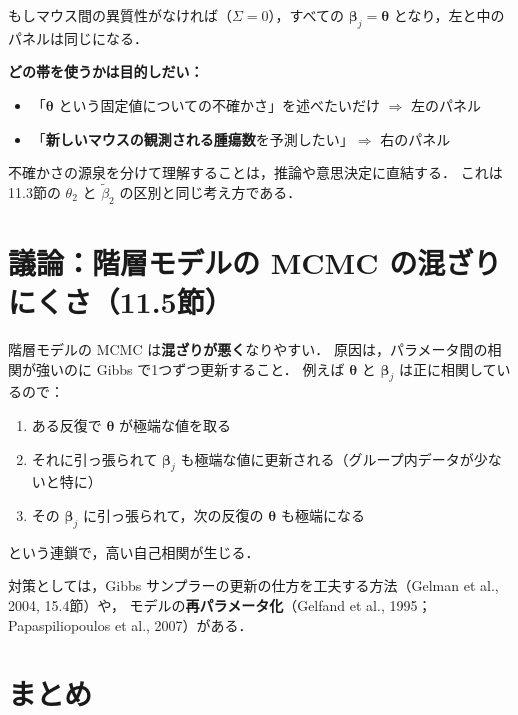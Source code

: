 \documentclass[lualatex,ja=standard,a4paper,12pt]{bxjsarticle}
\begin{document}
\noindent もしマウス間の異質性がなければ（$\Sigma = 0$），すべての $\bm{\beta}_j = \bm{\theta}$ となり，左と中のパネルは同じになる．

\begin{pointbox}
\textbf{どの帯を使うかは目的しだい：}
\begin{itemize}
  \item 「$\bm{\theta}$ という固定値についての不確かさ」を述べたいだけ $\Rightarrow$ 左のパネル
  \item 「\textbf{新しいマウスの観測される腫瘍数}を予測したい」$\Rightarrow$ 右のパネル
\end{itemize}
不確かさの源泉を分けて理解することは，推論や意思決定に直結する．
これは 11.3節の $\theta_2$ と $\tilde{\beta}_2$ の区別と同じ考え方である．
\end{pointbox}

\section{議論：階層モデルの MCMC の混ざりにくさ（11.5節）}

\begin{warningbox}
階層モデルの MCMC は\textbf{混ざりが悪く}なりやすい．
原因は，パラメータ間の相関が強いのに Gibbs で1つずつ更新すること．
例えば $\bm{\theta}$ と $\bm{\beta}_j$ は正に相関しているので：
\begin{enumerate}
  \item ある反復で $\bm{\theta}$ が極端な値を取る
  \item それに引っ張られて $\bm{\beta}_j$ も極端な値に更新される（グループ内データが少ないと特に）
  \item その $\bm{\beta}_j$ に引っ張られて，次の反復の $\bm{\theta}$ も極端になる
\end{enumerate}
という連鎖で，高い自己相関が生じる．
\end{warningbox}

\noindent 対策としては，Gibbs サンプラーの更新の仕方を工夫する方法（Gelman et al., 2004, 15.4節）や，
モデルの\textbf{再パラメータ化}（Gelfand et al., 1995；Papaspiliopoulos et al., 2007）がある．

\section{まとめ}
\end{document}
